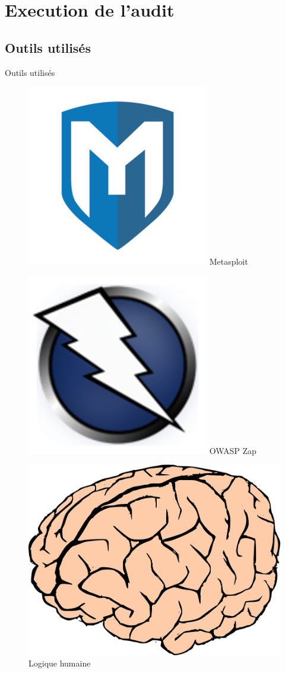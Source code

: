 \documentclass{beamer}
\begin{document}
\section{Execution de l'audit}	
\subsection{Outils utilisés} 
\begin{frame}{Outils utilisés}
	\begin{figure}
		\centering
		\begin{minipage}{.3\textwidth}
			\centering
			\includegraphics[width=.4\linewidth]{schemas/images/metasploit.png}
			\break
			Metasploit
		\end{minipage}%
		\begin{minipage}{.3\textwidth}
			\centering
			\includegraphics[width=.4\linewidth]{schemas/images/zap.png}
			\break 
			OWASP Zap
		\end{minipage}
		\begin{minipage}{.3\textwidth}
			\centering
			\includegraphics[width=.4\linewidth]{schemas/images/brain.png}
			\break 
			Logique humaine
		\end{minipage}
	\end{figure}	
\end{frame}
	  
\end{document}
